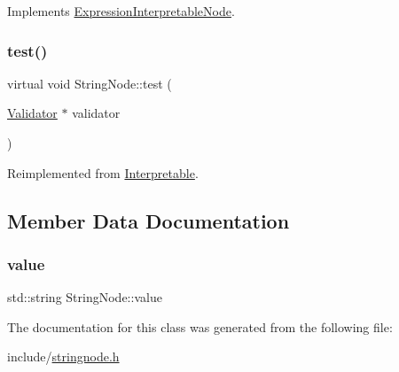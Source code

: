 Implements \hyperlink{classExpressionInterpretableNode_a43650f046c48fc539f77a207e3c9181e}{Expression\+Interpretable\+Node}.

\mbox{\label{classStringNode_a3836ad2a1bb6f86cd52663653a65bad8}} 
\subsubsection{\texorpdfstring{test()}{test()}}
{\footnotesize\ttfamily virtual void String\+Node\+::test (\begin{DoxyParamCaption}\item[{\hyperlink{classValidator}{Validator} $\ast$}]{validator }\end{DoxyParamCaption})\hspace{0.3cm}{\ttfamily [virtual]}}



Reimplemented from \hyperlink{classInterpretable_a32f547aaf68dcbab993284d3257ab010}{Interpretable}.



\subsection{Member Data Documentation}
\mbox{\label{classStringNode_a52fd9cb80da963e39d0d6d33d5396c93}} 
\subsubsection{\texorpdfstring{value}{value}}
{\footnotesize\ttfamily std\+::string String\+Node\+::value}



The documentation for this class was generated from the following file\+:\begin{DoxyCompactItemize}
\item 
include/\hyperlink{stringnode_8h}{stringnode.\+h}\end{DoxyCompactItemize}
